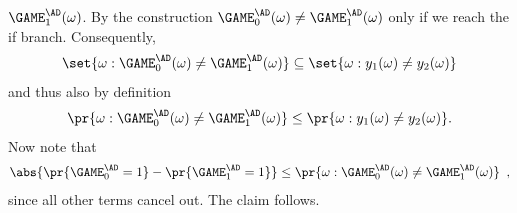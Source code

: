 \documentclass{crypto-exercise}
\begin{document}
\begin{solution}
$\GAME_1^\AD(\omega)$. By the construction
$\GAME_0^\AD(\omega)\neq\GAME_1^\AD(\omega)$ only if we reach the if
branch. Consequently,
\begin{align*}
  \set{\omega: \GAME_0^\AD(\omega)\neq\GAME_1^\AD(\omega)}\subseteq
  \set{\omega:y_1(\omega)\neq y_2(\omega)}
\end{align*}
and thus also by definition 
\begin{align*}
  \pr{\omega: \GAME_0^\AD(\omega)\neq\GAME_1^\AD(\omega)}\leq
  \pr{\omega:y_1(\omega)\neq y_2(\omega)}.
\end{align*}
Now note that 
\begin{align*}
  \abs{\pr{\GAME_0^\AD=1}-\pr{\GAME_1^\AD=1}}\leq  \pr{\omega: \GAME_0^\AD(\omega)\neq\GAME_1^\AD(\omega)}\enspace,
\end{align*}
since all other terms cancel out. The claim follows.


\end{solution}
\end{document}
